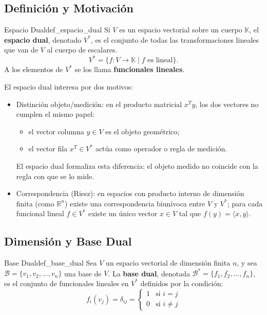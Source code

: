 \documentclass[11pt, a4paper]{article}
\begin{document}
\subsection{Definición y Motivación}

\begin{definicion}{Espacio Dual}{def_espacio_dual}
Si $V$ es un espacio vectorial sobre un cuerpo $\mathbb{K}$, el \textbf{espacio dual}, denotado $V^*$, es el conjunto de todas las transformaciones lineales que van de $V$ al cuerpo de escalares.
\[
V^* = \{ f: V \to \mathbb{K} \mid f \text{ es lineal} \}.
\]
A los elementos de $V^*$ se los llama \textbf{funcionales lineales}.
\end{definicion}

El espacio dual interesa por dos motivos:

\begin{itemize}
    \item Distinción objeto/medición: en el producto matricial $x^T y$, los dos vectores no cumplen el mismo papel:
    \begin{itemize}
        \item el vector columna $y \in V$ es el objeto geométrico;
        \item el vector fila $x^T \in V^*$ actúa como operador o regla de medición.
    \end{itemize}
    El espacio dual formaliza esta diferencia: el objeto medido no coincide con la regla con que se lo mide.

    \item Correspondencia (Riesz): en espacios con producto interno de dimensión finita (como $\mathbb{R}^n$) existe una correspondencia biunívoca entre $V$ y $V^*$; para cada funcional lineal $f \in V^*$ existe un único vector $x \in V$ tal que $f(y) = \langle x, y \rangle$.
\end{itemize}

\subsection{Dimensión y Base Dual}

\begin{definicion}{Base Dual}{def_base_dual}
Sea $V$ un espacio vectorial de dimensión finita $n$, y sea $\mathcal{B} = \{v_1, v_2, \dots, v_n\}$ una base de $V$. 
La \textbf{base dual}, denotada $\mathcal{B}^* = \{f_1, f_2, \dots, f_n\}$, es el conjunto de funcionales lineales en $V^*$ definidos por la condición:
\[
f_i(v_j) = \delta_{ij} = \begin{cases} 
1 & \text{si } i = j \\
0 & \text{si } i \neq j
\end{cases}
\]
\end{definicion}
\end{document}
